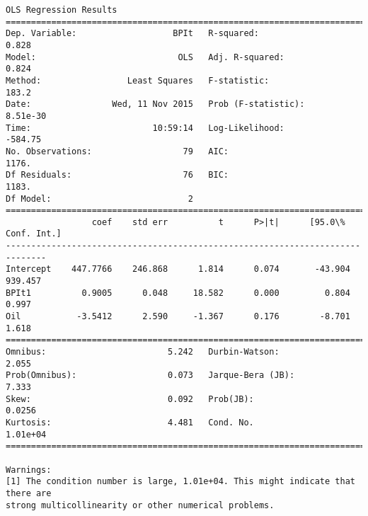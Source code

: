 \documentclass{article}
\begin{document}
    \begin{Verbatim}[commandchars=\\\{\}]
OLS Regression Results                            
==============================================================================
Dep. Variable:                   BPIt   R-squared:                       0.828
Model:                            OLS   Adj. R-squared:                  0.824
Method:                 Least Squares   F-statistic:                     183.2
Date:                Wed, 11 Nov 2015   Prob (F-statistic):           8.51e-30
Time:                        10:59:14   Log-Likelihood:                -584.75
No. Observations:                  79   AIC:                             1176.
Df Residuals:                      76   BIC:                             1183.
Df Model:                           2                                         
==============================================================================
                 coef    std err          t      P>|t|      [95.0\% Conf. Int.]
------------------------------------------------------------------------------
Intercept    447.7766    246.868      1.814      0.074       -43.904   939.457
BPIt1          0.9005      0.048     18.582      0.000         0.804     0.997
Oil           -3.5412      2.590     -1.367      0.176        -8.701     1.618
==============================================================================
Omnibus:                        5.242   Durbin-Watson:                   2.055
Prob(Omnibus):                  0.073   Jarque-Bera (JB):                7.333
Skew:                           0.092   Prob(JB):                       0.0256
Kurtosis:                       4.481   Cond. No.                     1.01e+04
==============================================================================

Warnings:
[1] The condition number is large, 1.01e+04. This might indicate that there are
strong multicollinearity or other numerical problems.
    \end{Verbatim}
\end{document}

